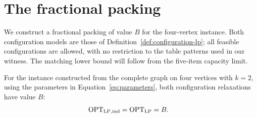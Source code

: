 \section{The fractional packing}\label{sec:fractional}

We construct a fractional packing of value $B$ for the four-vertex
instance. Both configuration models are those of
Definition~\ref{def:configuration-lp}; all feasible configurations are
allowed, with no restriction to the table patterns used in our witness.
The matching lower bound will follow from the five-item capacity limit.

\begin{proposition}\label{prop:fractional}
For the instance constructed from the complete graph on four
vertices with $k=2$, using the parameters in
Equation~\eqref{eq:parameters}, both configuration relaxations have
value $B$:
\[
 \operatorname{OPT}_{\mathrm{LP,ind}}=\operatorname{OPT}_{\mathrm{LP}}=B.
\]
\end{proposition}

